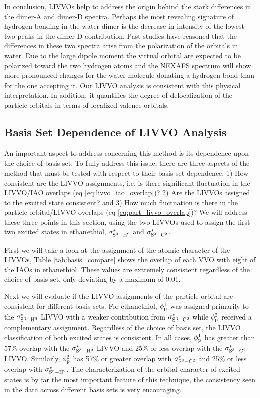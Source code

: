 \documentclass{article}
\begin{document}
In conclusion, LIVVOs help to address the origin behind the stark differences in the dimer-A and dimer-D spectra.
Perhaps the most revealing signature of hydrogen bonding in the water dimer is the decrease in intensity of the lowest two peaks in the dimer-D contribution.
Past studies have reasoned that the differences in these two spectra arise from the polarization of the orbitals in water.\cite{fransson_requirements_2016,cavalleri_interpretation_2002}
Due to the large dipole moment the virtual orbital are expected to be polarized toward the two hydrogen atoms and the NEXAFS spectrum will show more pronounced changes for the water molecule donating a hydrogen bond than for the one accepting it.
Our LIVVO analysis is consistent with this physical interpretation.
In addition, it quantifies the degree of delocalization of the particle orbitals in terms of localized valence orbitals.

\subsection{Basis Set Dependence of LIVVO Analysis}
An important aspect to address concerning this method is its dependence upon the choice of basis set. To fully address this issue, there are three aspects of the method that must be tested with respect to their basis set dependence: 1) How consistent are the LIVVO assignments, i.e. is there significant fluctuation in the LIVVO/IAO overlaps (eq \ref{eq:livvo_iao_overlap})? 2) Are the LIVVOs assigned to the excited state consistent? and 3) How much fluctuation is there in the particle orbital/LIVVO overlaps (eq \ref{eq:part_livvo_overlap})? We will address these three points in this section, using the two LIVVOs used to assign the first two excited states in ethanethiol, $\sigma^*_{\rm S^3-H^9}$ and $\sigma^*_{\rm S^3-C^2}$.

First we will take a look at the assignment of the atomic character of the LIVVOs, Table \ref{tab:basis_compare} shows the overlap of each VVO with eight of the IAOs in ethanethiol. These values are extremely consistent regardless of the choice of basis set, only deviating by a maximum of 0.01.

Next we will evaluate if the LIVVO assignments of the particle orbital are consistent for different basis sets. For ethanethiol, $\phi^1_{\rm p}$ was assigned primarily to the $\sigma^*_{\rm S^3-H^9}$ LIVVO with a weaker contribution from $\sigma^*_{\rm S^3-C^2}$ while $\phi^2_{\rm p}$ received a complementary assignment. Regardless of the choice of basis set, the LIVVO classification of both excited states is consistent. In all cases, $\phi^1_{\rm p}$ has greater than 57\% overlap with the  $\sigma^*_{\rm S^3-H^9}$ LIVVO and 25\% or less overlap with the $\sigma^*_{\rm S^3-C^2}$ LIVVO. Similarly, $\phi^2_{\rm p}$ has 57\% or greater overlap with $\sigma^*_{\rm S^3-C^2}$ and 25\% or less overlap with  $\sigma^*_{\rm S^3-H^9}$. The characterization of the orbital character of excited states is by far the most important feature of this technique, the consistency seen in the data across different basis sets is very encouraging. 
\end{document}
